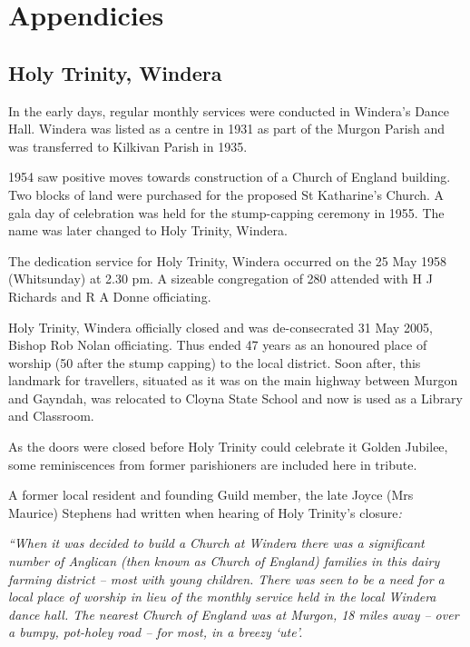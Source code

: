 \backmatter
\chapter{Appendicies}
\nobalance


\section{Holy Trinity, Windera}



In the early days, regular monthly services were conducted in Windera's Dance Hall. Windera was listed as a centre in 1931 as part of the Murgon Parish and was transferred to Kilkivan Parish in 1935.



1954 saw positive moves towards construction of a Church of England building. Two blocks of land were purchased for the proposed St Katharine's Church. A gala day of celebration was held for the stump-capping ceremony in 1955. The name was later changed to Holy Trinity, Windera.



The dedication service for Holy Trinity, Windera occurred on the 25 May 1958 (Whitsunday) at 2.30 pm. A sizeable congregation of 280 attended with H J Richards and R A Donne officiating.



Holy Trinity, Windera officially closed and was de-consecrated 31 May 2005, Bishop Rob Nolan officiating. Thus ended 47 years as an honoured place of worship (50 after the stump capping) to the local district. Soon after, this landmark for travellers, situated as it was on the main highway between Murgon and Gayndah, was relocated to Cloyna State School and now is used as a Library and Classroom.



As the doors were closed before Holy Trinity could celebrate it Golden Jubilee, some reminiscences from former parishioners are included here in tribute.



A former local resident and founding Guild member, the late Joyce (Mrs Maurice) Stephens had written when hearing of Holy Trinity's closure\emph{:}



\emph{``When it was decided to build a Church at Windera there was a significant number of Anglican (then known as Church of England) families in this dairy farming district -- most with young children. There was seen to be a need for a local place of worship in lieu of the monthly service held in the local Windera dance hall. The nearest Church of England was at Murgon, 18 miles away -- over a bumpy, pot-holey road -- for most, in a breezy `ute'.}



